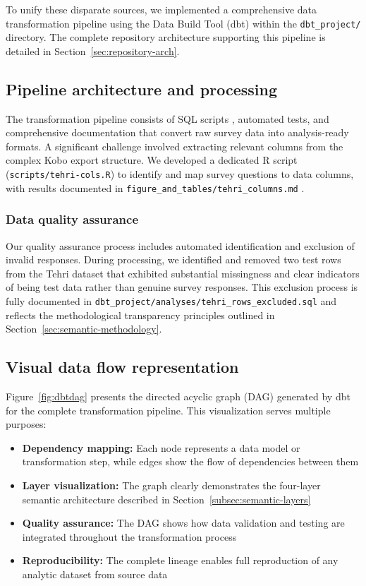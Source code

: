 \documentclass{article}
\begin{document}
To unify these disparate sources, we implemented a comprehensive data transformation pipeline using the Data Build Tool (dbt) \cite{dbt_core,dbt_duckdb} within the \texttt{dbt\_project/} directory. The complete repository architecture supporting this pipeline is detailed in Section~\ref{sec:repository-arch}.

\subsection{Pipeline architecture and processing}

The transformation pipeline consists of SQL scripts \cite{sql}, automated tests, and comprehensive documentation that convert raw survey data into analysis-ready formats. A significant challenge involved extracting relevant columns from the complex Kobo export structure. We developed a dedicated R script \cite{r_core,tidyverse} (\texttt{scripts/tehri-cols.R}) to identify and map survey questions to data columns, with results documented in \texttt{figure\_and\_tables/tehri\_columns.md} \cite{markdown}.

\subsubsection{Data quality assurance}

Our quality assurance process includes automated identification and exclusion of invalid responses. During processing, we identified and removed two test rows from the Tehri dataset that exhibited substantial missingness and clear indicators of being test data rather than genuine survey responses. This exclusion process is fully documented in \texttt{dbt\_project/analyses/tehri\_rows\_excluded.sql} and reflects the methodological transparency principles outlined in Section~\ref{sec:semantic-methodology}.

\subsection{Visual data flow representation}

Figure~\ref{fig:dbtdag} presents the directed acyclic graph (DAG) generated by dbt for the complete transformation pipeline. This visualization serves multiple purposes:

\begin{itemize}
    \item \textbf{Dependency mapping:} Each node represents a data model or transformation step, while edges show the flow of dependencies between them
    \item \textbf{Layer visualization:} The graph clearly demonstrates the four-layer semantic architecture described in Section~\ref{subsec:semantic-layers}
    \item \textbf{Quality assurance:} The DAG shows how data validation and testing are integrated throughout the transformation process
    \item \textbf{Reproducibility:} The complete lineage enables full reproduction of any analytic dataset from source data
\end{itemize}
\end{document}
